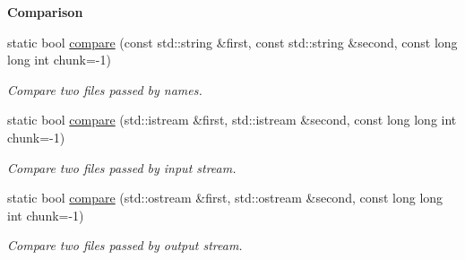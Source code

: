 \begin{Indent}{\bf Comparison}\par
\begin{DoxyCompactItemize}
\item 
static bool \hyperlink{exceptionmagrathea_1_1FileSystem_ac26eddde6c5fa22440c29b81e8967290}{compare} (const std\-::string \&first, const std\-::string \&second, const long long int chunk=-\/1)
\begin{DoxyCompactList}\small\item\em Compare two files passed by names. \end{DoxyCompactList}\item 
static bool \hyperlink{exceptionmagrathea_1_1FileSystem_acd721bd279d0095255b832f0e9032969}{compare} (std\-::istream \&first, std\-::istream \&second, const long long int chunk=-\/1)
\begin{DoxyCompactList}\small\item\em Compare two files passed by input stream. \end{DoxyCompactList}\item 
static bool \hyperlink{exceptionmagrathea_1_1FileSystem_af2a9323b17881fdddfe256bc2ade30e3}{compare} (std\-::ostream \&first, std\-::ostream \&second, const long long int chunk=-\/1)
\begin{DoxyCompactList}\small\item\em Compare two files passed by output stream. \end{DoxyCompactList}\end{DoxyCompactItemize}
\end{Indent}
